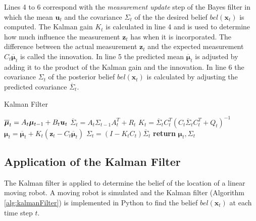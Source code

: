 \documentclass[12pt,oneside,openany,a4paper, %
afrikaans,english,
]{memoir}
\numberwithin{equation}{chapter}
\begin{document}
Lines 4 to 6 correspond with the \textit{measurement update} step of the Bayes filter in which the mean $\bm{u}_t$ and the covariance $\Sigma_t $ of the the desired belief $bel(\bm{x}_t)$ is computed. The Kalman gain $K_t$ is calculated in line 4 and is used to determine how much influence the measurement $\bm{z}_t$ has when it is incorporated. The difference between the actual measurement $\bm{z}_t$ and the expected measurement $C_t \bm{\overline{\mu}}_t$ is called the innovation. In line 5 the predicted mean $\overline{\bm{\mu}}_t$ is adjusted by adding it to the product of the Kalman gain and the innovation. In line 6 the covariance $\Sigma_t$ of the posterior belief $bel(\bm{x}_t)$ is calculated by adjusting the predicted covariance $\overline{\Sigma}_t$. 
\begin{algorithm}
\caption{Kalman Filter}\label{alg:kalmanFilter}
\begin{algorithmic}[1]
\State $\overline{\bm{\mu}}_t = A_t \bm{\mu}_{t-1} + B_t \bm{u_}t$
\State $\overline{\Sigma}_t = A_t \Sigma_{t-1} A_t^T + R_t$
\State $K_t = \overline{\Sigma}_t C_t^T(C_t\overline{\Sigma}_t C_t^T + Q_t)^{-1}$
\State $\bm{\mu}_t = \overline{\bm{\mu}}_t + K_t(\bm{z}_t - C_t \overline{\bm{\mu}}_t)$
\State $\Sigma_t = (I - K_tC_t)\overline{\Sigma}_t$
\State \textbf{return} $\bm{\mu}_t, \Sigma_t$
\EndProcedure
\end{algorithmic}
\end{algorithm}

\subsection{Application of the Kalman Filter}\label{subsec:appEKF}
The Kalman filter is applied to determine the belief of the location of a linear moving robot. A moving robot is simulated and the Kalman filter (Algorithm \ref{alg:kalmanFilter}) is implemented in Python to find the belief $bel(\bm{x}_t)$ at each time step $t$.
\end{document}
